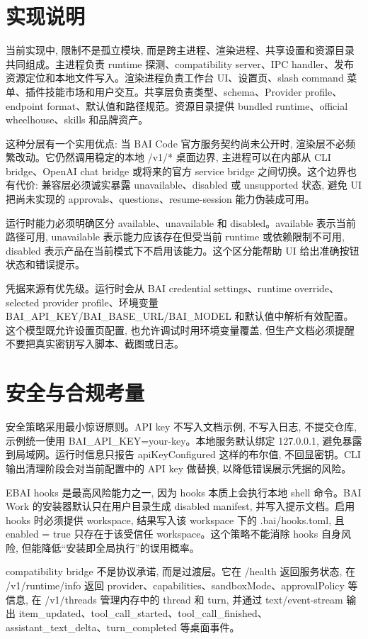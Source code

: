 \section{实现说明}
当前实现中, 限制不是孤立模块, 而是跨主进程、渲染进程、共享设置和资源目录共同组成。主进程负责 runtime 探测、compatibility server、IPC handler、发布资源定位和本地文件写入。渲染进程负责工作台 UI、设置页、slash command 菜单、插件技能市场和用户交互。共享层负责类型、schema、Provider profile、endpoint format、默认值和路径规范。资源目录提供 bundled runtime、official wheelhouse、skills 和品牌资产。

这种分层有一个实用优点: 当 BAI Code 官方服务契约尚未公开时, 渲染层不必频繁改动。它仍然调用稳定的本地 /v1/* 桌面边界, 主进程可以在内部从 CLI bridge、OpenAI chat bridge 或将来的官方 service bridge 之间切换。这个边界也有代价: 兼容层必须诚实暴露 unavailable、disabled 或 unsupported 状态, 避免 UI 把尚未实现的 approvals、questions、resume-session 能力伪装成可用。

运行时能力必须明确区分 available、unavailable 和 disabled。available 表示当前路径可用, unavailable 表示能力应该存在但受当前 runtime 或依赖限制不可用, disabled 表示产品在当前模式下不启用该能力。这个区分能帮助 UI 给出准确按钮状态和错误提示。

凭据来源有优先级。运行时会从 BAI credential settings、runtime override、selected provider profile、环境变量 BAI\_API\_KEY/BAI\_BASE\_URL/BAI\_MODEL 和默认值中解析有效配置。这个模型既允许设置页配置, 也允许调试时用环境变量覆盖, 但生产文档必须提醒不要把真实密钥写入脚本、截图或日志。

\section{安全与合规考量}
安全策略采用最小惊讶原则。API key 不写入文档示例, 不写入日志, 不提交仓库, 示例统一使用 BAI\_API\_KEY=your-key。本地服务默认绑定 127.0.0.1, 避免暴露到局域网。运行时信息只报告 apiKeyConfigured 这样的布尔值, 不回显密钥。CLI 输出清理阶段会对当前配置中的 API key 做替换, 以降低错误展示凭据的风险。

EBAI hooks 是最高风险能力之一, 因为 hooks 本质上会执行本地 shell 命令。BAI Work 的安装器默认只在用户目录生成 disabled manifest, 并写入提示文档。启用 hooks 时必须提供 workspace, 结果写入该 workspace 下的 .bai/hooks.toml, 且 enabled = true 只存在于该受信任 workspace。这个策略不能消除 hooks 自身风险, 但能降低“安装即全局执行”的误用概率。

compatibility bridge 不是协议承诺, 而是过渡层。它在 /health 返回服务状态, 在 /v1/runtime/info 返回 provider、capabilities、sandboxMode、approvalPolicy 等信息, 在 /v1/threads 管理内存中的 thread 和 turn, 并通过 text/event-stream 输出 item\_updated、tool\_call\_started、tool\_call\_finished、assistant\_text\_delta、turn\_completed 等桌面事件。

